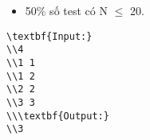 \begin{itemize}
	\item     50\% số test có N  $\le$  20.   
\end{itemize}
\begin{verbatim}
\textbf{Input:}
\\4
\\1 1
\\1 2
\\2 2
\\3 3
\\\textbf{Output:}
\\3\end{verbatim}